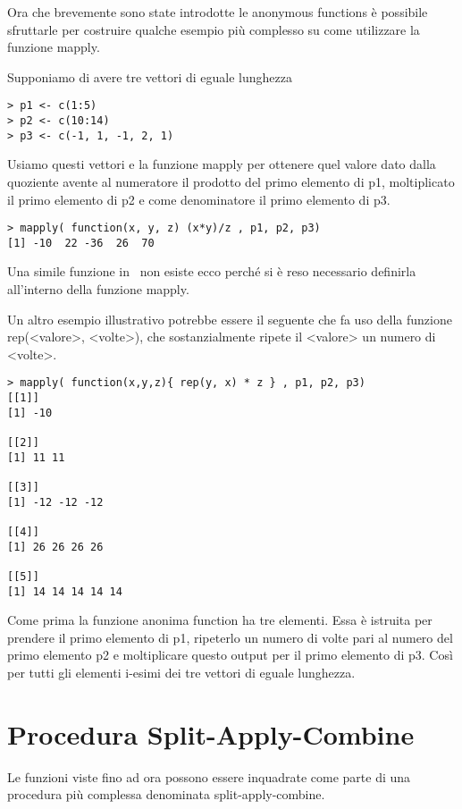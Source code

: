 Ora che brevemente sono state introdotte le anonymous functions è possibile sfruttarle per costruire qualche esempio più complesso su come utilizzare la funzione \textsf{mapply}.

Supponiamo di avere tre vettori di eguale lunghezza 
\begin{lstlisting}
> p1 <- c(1:5)
> p2 <- c(10:14)
> p3 <- c(-1, 1, -1, 2, 1)
\end{lstlisting}

Usiamo questi vettori e la funzione \textsf{mapply} per ottenere quel valore dato dalla quoziente avente al numeratore il prodotto del primo elemento di p1, moltiplicato il primo elemento di p2 e come denominatore il primo elemento di p3.

\begin{lstlisting}
> mapply( function(x, y, z) (x*y)/z , p1, p2, p3)
[1] -10  22 -36  26  70
\end{lstlisting}

Una simile funzione in \erre\ non esiste ecco perché si è reso necessario definirla all'interno della funzione \textsf{mapply}.

Un altro esempio illustrativo potrebbe essere il seguente che fa uso della funzione \textsf{rep(<valore>, <volte>)}, che sostanzialmente ripete il <valore> un numero di <volte>.
\begin{lstlisting}
> mapply( function(x,y,z){ rep(y, x) * z } , p1, p2, p3)
[[1]]
[1] -10

[[2]]
[1] 11 11

[[3]]
[1] -12 -12 -12

[[4]]
[1] 26 26 26 26

[[5]]
[1] 14 14 14 14 14
\end{lstlisting}

Come prima la funzione anonima function ha tre elementi. Essa è istruita per prendere il primo elemento di p1, ripeterlo un numero di volte pari al numero del primo elemento p2 e moltiplicare questo output per il primo elemento di p3. Così per tutti gli elementi i-esimi dei tre vettori di eguale lunghezza.

\section{Procedura Split-Apply-Combine}

Le funzioni viste fino ad ora possono essere inquadrate come parte di una procedura più complessa denominata split-apply-combine.
